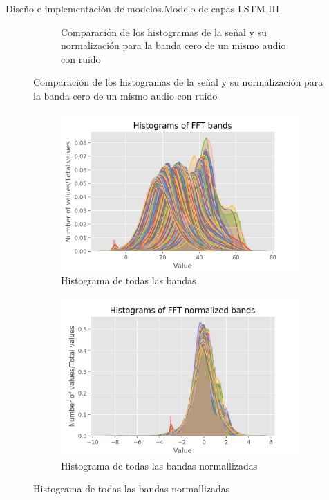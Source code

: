 \begin{frame}[fragile]{Diseño e implementación de modelos.\newline Modelo de capas LSTM III}
\begin{figure}
\begin{subfigure}[t]{0.4\textwidth}
			\vspace*{-7pt}
			\caption{Comparación de los histogramas de la señal y su normalización para la banda cero de un mismo audio con ruido}
			\label{fig: norm_hist}
		\end{subfigure}
	\end{figure}
	\vspace*{-17pt}
	\begin{figure}
		\centering
		\begin{subfigure}[t]{0.4\textwidth}
			\centering
			\includegraphics[width=\textwidth]{../figures/bands_hist}
			\vspace*{-7pt}
			\caption{Histograma de todas las bandas}
			\label{fig: bands_hist}
		\end{subfigure}%
		\hspace*{10pt}
		\begin{subfigure}[t]{0.4\textwidth}
			\centering
			\includegraphics[width=\textwidth]{../figures/bands_norm_hist}
			\vspace*{-7pt}
			\caption{Histograma de todas las bandas normallizadas}
			\label{fig: bands_norm_hist}
		\end{subfigure}
	\end{figure}
\end{frame}